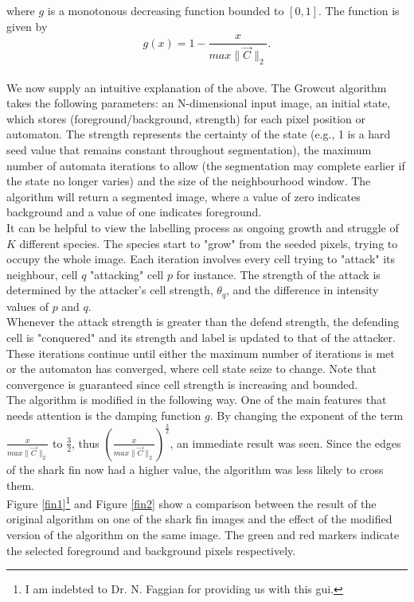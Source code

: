 \documentclass[a4paper,10pt]{article}
\begin{document}
\noindent where $g$ is a monotonous decreasing function bounded to $[0, 1]$. 
The function is given by
\[
g(x) = 1 - \frac{x}{max\| \overrightarrow{C} \|_{2}}. 
\]\\

We now supply an intuitive explanation of the above.
The Growcut algorithm takes the following parameters: an N-dimensional input image,
an initial state, which stores (foreground/background, strength) for
each pixel position or automaton.  The strength represents the
certainty of the state (e.g., 1 is a hard seed value that remains
constant throughout segmentation), the maximum number of automata iterations to allow   
(the segmentation may complete earlier if the state no longer varies) and the
size of the neighbourhood window.  The algorithm will return a segmented image, 
where a value of zero indicates background and a value of one indicates foreground. \\

It can be helpful to view the labelling process as ongoing growth and struggle of $K$ different species.
The species start to "grow" from the seeded pixels, trying to occupy the whole image.  
Each iteration involves every cell trying to "attack" its neighbour, cell $q$ "attacking" cell $p$ for instance. 
The strength of the attack is determined by the attacker's cell strength, $\theta_{q}$, and
the difference in intensity values of $p$ and $q$. \\

Whenever the attack strength is greater than the defend strength, the defending cell is "conquered" and
its strength and label is updated to that of the attacker. 
These iterations continue until either the maximum number of iterations is met or the automaton has converged,
where cell state seize to change.  Note that convergence is guaranteed since cell strength is increasing and bounded. \\

\noindent The algorithm is modified in the following way.  One of the
main features that needs attention is the damping function $g$.  By changing
the exponent of the term $\frac{x}{max\| \overrightarrow{C} \|_{2}}$ to
$\frac{3}{2}$, thus $\left ({\frac{x}{max\| \overrightarrow{C} \|_{2}}}\right
) ^\frac{3}{2}$,
an immediate result was seen.  Since the edges of the shark fin now 
  had a higher value, the algorithm was less likely to cross them. \\  
 
Figure \ref{fin1}\footnote{I am indebted to Dr. N. Faggian for providing us with this gui.} and Figure \ref{fin2} show a comparison between the result of the original algorithm on
one of the shark fin images and the effect of the modified version of the
algorithm on the same image.  The green and red markers indicate the selected foreground and background pixels respectively.
\end{document}

